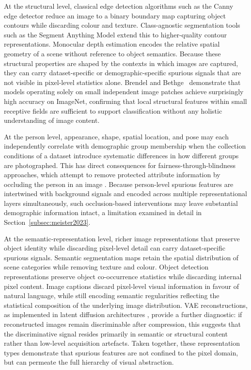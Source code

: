 At the structural level, classical edge detection algorithms such as the
Canny edge detector \cite{Canny_1986_CannyEdgeDetection} reduce an image to a binary
boundary map capturing object contours while discarding colour and texture. Class-agnostic
segmentation tools such as the Segment Anything Model \cite{Kirillov_2023_SAM} extend
this to higher-quality contour representations. Monocular depth estimation encodes the
relative spatial geometry of a scene without reference to object semantics. Because these structural properties are shaped by the contexts in which images are
captured, they can carry dataset-specific or demographic-specific spurious signals that
are not visible in pixel-level statistics alone. Brendel and Bethge~\cite{Brendel_2019_BagNet}
demonstrate that models operating solely on small independent image patches achieve
surprisingly high accuracy on ImageNet, confirming that local structural features within
small receptive fields are sufficient to support classification without any holistic
understanding of image content.

At the person level, appearance, shape, spatial location, and pose may each independently
correlate with demographic group membership when the collection conditions
of a dataset introduce systematic differences in how different groups are photographed.
This has direct consequences for fairness-through-blindness approaches, which attempt to
remove protected attribute information by occluding the person in an image
\cite{Burns_2018_WomenAlsoSnowboard, Wang_2019_BalancedDatasetsNotEnough}. Because
person-level spurious features are intertwined with background signals and encoded across
multiple representational layers simultaneously, such occlusion-based interventions may
leave substantial demographic information intact, a limitation examined in detail in
Section~\ref{subsec:meister2023}.

At the semantic-representation level, richer image representations that preserve object
identity while discarding pixel-level detail can carry dataset-specific spurious
signals. Semantic segmentation maps retain the spatial distribution of scene categories
while removing texture and colour. Object detection representations preserve object
co-occurrence statistics while discarding internal pixel content. Image captions discard pixel-level visual information in favour of natural language, while
still encoding semantic regularities reflecting the statistical composition of the
underlying image distribution. VAE reconstructions, as implemented in latent diffusion architectures \cite{Rombach_2022_CVPR},
provide a further diagnostic: if reconstructed images remain discriminable after
compression, this suggests that the discriminative signal resides primarily in semantic
or structural content rather than low-level acquisition artefacts. Taken together, these representation types demonstrate that spurious features are not
confined to the pixel domain, but can permeate the full hierarchy of visual abstraction.

